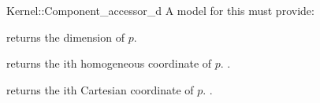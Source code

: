 \begin{ccRefFunctionObjectConcept}{Kernel::Component_accessor_d}
A model for this must provide:


 {returns
  the dimension of $p$.}

 {returns the ith homogeneous coordinate of $p$.  \ccPrecond
  .}

 {returns the ith Cartesian coordinate of $p$.  \ccPrecond
  .}

\end{ccRefFunctionObjectConcept}
